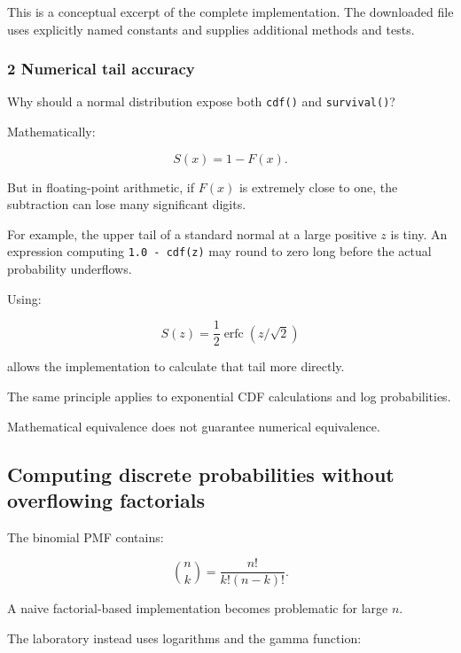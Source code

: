 This is a conceptual excerpt of the complete implementation. The downloaded file uses explicitly named constants and supplies additional methods and tests.

\subsubsection{2 Numerical tail accuracy}\label{02-foundations-ii-ch031-numerical-tail-accuracy}

Why should a normal distribution expose both \texttt{cdf()} and \texttt{survival()}?

Mathematically:

\[
 S(x)=1-F(x).
\]

But in floating-point arithmetic, if \(F(x)\) is extremely close to one, the subtraction can lose many significant digits.

For example, the upper tail of a standard normal at a large positive \(z\) is tiny. An expression computing \texttt{1.0\ -\ cdf(z)} may round to zero long before the actual probability underflows.

Using:

\[
 S(z)=\frac12\operatorname{erfc}(z/\sqrt2)
\]

allows the implementation to calculate that tail more directly.

The same principle applies to exponential CDF calculations and log probabilities.

Mathematical equivalence does not guarantee numerical equivalence.

\subsection{Computing discrete probabilities without overflowing factorials}\label{02-foundations-ii-ch031-computing-discrete-probabilities-without-overflowing-factorials}

The binomial PMF contains:

\[
 \binom nk= \frac{n!}{k!(n-k)!}.
\]

A naive factorial-based implementation becomes problematic for large \(n\).

The laboratory instead uses logarithms and the gamma function:

